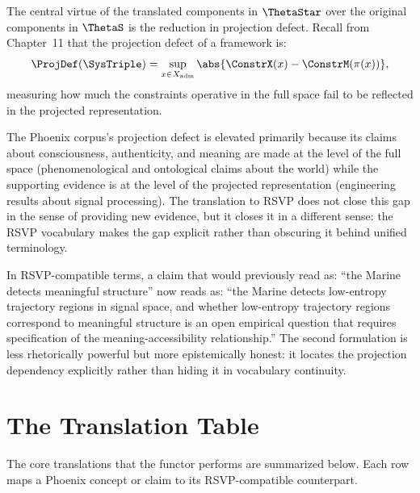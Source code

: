 The central virtue of the translated components in
$\ThetaStar$ over the original components in $\ThetaS$
is the reduction in projection defect. Recall from
Chapter~11 that the projection defect of a framework
is:
\[
  \ProjDef(\SysTriple)
  = \sup_{x \in X_{\mathrm{adm}}}
  \abs{\ConstrX(x) - \ConstrM(\pi(x))},
\]
measuring how much the constraints operative in the
full space fail to be reflected in the projected
representation.

The Phoenix corpus's projection defect is elevated
primarily because its claims about consciousness,
authenticity, and meaning are made at the level of
the full space (phenomenological and ontological claims
about the world) while the supporting evidence is at
the level of the projected representation (engineering
results about signal processing). The translation to
RSVP does not close this gap in the sense of providing
new evidence, but it closes it in a different sense:
the RSVP vocabulary makes the gap explicit rather than
obscuring it behind unified terminology.

In RSVP-compatible terms, a claim that would previously
read as: ``the Marine detects meaningful structure''
now reads as: ``the Marine detects low-entropy trajectory
regions in signal space, and whether low-entropy
trajectory regions correspond to meaningful structure
is an open empirical question that requires specification
of the meaning-accessibility relationship.'' The
second formulation is less rhetorically powerful but
more epistemically honest: it locates the projection
dependency explicitly rather than hiding it in
vocabulary continuity.

\section{The Translation Table}
\label{sec:translation-table}

The core translations that the functor performs are
summarized below. Each row maps a Phoenix concept or
claim to its RSVP-compatible counterpart.

